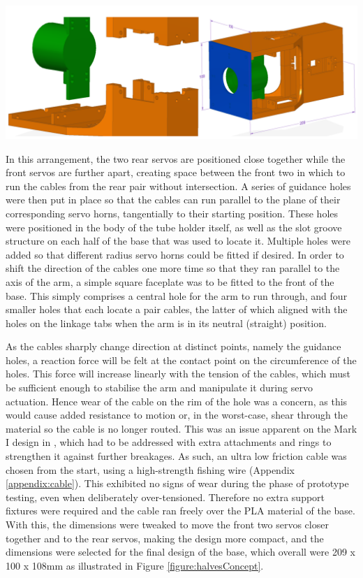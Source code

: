 \documentclass[11pt]{article}
\begin{document}
\begin{center}
\includegraphics[width=\textwidth]{images/halvesConcept.png}
\label{figure:halvesConcept}
\end{center}

In this arrangement, the two rear servos are positioned close together while the front servos are further apart, creating space between the front two in which to run the cables from the rear pair without intersection. A series of guidance holes were then put in place so that the cables can run parallel to the plane of their corresponding servo horns, tangentially to their starting position. These holes were positioned in the body of the tube holder itself, as well as the slot groove structure on each half of the base that was used to locate it. Multiple holes were added so that different radius servo horns could be fitted if desired. In order to shift the direction of the cables one more time so that they ran parallel to the axis of the arm, a simple square faceplate was to be fitted to the front of the base. This simply comprises a central hole for the arm to run through, and four smaller holes that each locate a pair cables, the latter of which aligned with the holes on the linkage tabs when the arm is in its neutral (straight) position.

As the cables sharply change direction at distinct points, namely the guidance holes, a reaction force will be felt at the contact point on the circumference of the holes. This force will increase linearly with the tension of the cables, which must be sufficient enough to stabilise the arm and manipulate it during servo actuation. Hence wear of the cable on the rim of the hole was a concern, as this would cause added resistance to motion or, in the worst-case, shear through the material so the cable is no longer routed. This was an issue apparent on the Mark I design in \cite{GreggSmithDesign}, which had to be addressed with extra attachments and rings to strengthen it against further breakages. As such, an ultra low friction cable was chosen from the start, using a high-strength fishing wire (Appendix \ref{appendix:cable}). This exhibited no signs of wear during the phase of prototype testing, even when deliberately over-tensioned. Therefore no extra support fixtures were required and the cable ran freely over the PLA material of the base. With this, the dimensions were tweaked to move the front two servos closer together and to the rear servos, making the design more compact, and the dimensions were selected for the final design of the base, which overall were 209 x 100 x 108mm as illustrated in Figure \ref{figure:halvesConcept}.
\end{document}
